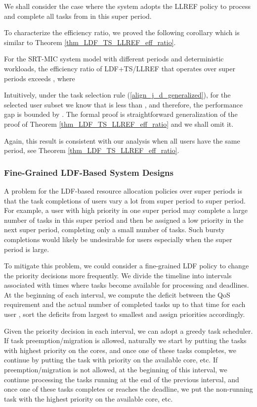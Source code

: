 \documentclass[prodmode,acmtompecs]{acmsmall}
\begin{document}
We shall consider the case where the system adopts the LLREF policy to process and complete all tasks from  in this super period. 

To characterize the efficiency ratio, we proved the following corollary which is similar to Theorem \ref{thm_LDF_TS_LLREF_eff_ratio}. 
\begin{corollary}
\label{corollary_LDF_TS_LLREF_eff_ratio_generalized}
For the SRT-MIC  system model with different periods and deterministic workloads, the efficiency ratio of LDF+TS/LLREF that operates over super periods exceeds , where

\end{corollary}

Intuitively, under the task selection rule (\ref{align_j_d_generalized}), for the selected user subset  we know that  is less than , and therefore, the performance gap is bounded by . The formal proof is straightforward generalization of the proof of Theorem \ref{thm_LDF_TS_LLREF_eff_ratio} and we shall omit it. 

Again, this result is consistent with our analysis when all users have the same period, see Theorem \ref{thm_LDF_TS_LLREF_eff_ratio}. 

\subsubsection{Fine-Grained LDF-Based System Designs}
A problem for the LDF-based resource allocation policies over super periods is that the task completions of users vary a lot from super period to super period. For example, a user with high priority in one super period may complete a large number of tasks in this super period and then be assigned a low priority in the next super period, completing only a small number of tasks. Such bursty completions would likely be undesirable for users especially when the super period  is large. 

To mitigate this problem, we could consider a fine-grained LDF policy to change the priority decisions more frequently. We divide the timeline into intervals associated with times where tasks become available for processing and deadlines. At the beginning of each interval, we compute the deficit between the QoS requirement and the actual number of completed tasks up to that time for each user , sort the deficits from largest to smallest and assign priorities accordingly. 

Given the priority decision in each interval, we can adopt a greedy task scheduler. 
If task preemption/migration is allowed, naturally we start by putting the  tasks with highest priority on the  cores, and once one of these tasks completes, we continue by putting the task with priority  on the available core, etc. 
If preemption/migration is not allowed, at the beginning of this interval, we continue processing the tasks running at the end of the previous interval, and once one of these tasks completes or reaches the deadline, we put the non-running task with the highest priority on the available core, etc. 
\end{document}
